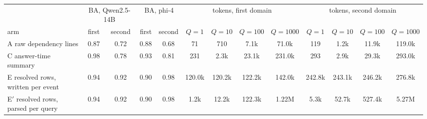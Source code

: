 \begin{tabular}{l cc cc cccc cccc}
\toprule
 & \multicolumn{2}{c}{BA, Qwen2.5-14B} & \multicolumn{2}{c}{BA, phi-4} & \multicolumn{4}{c}{tokens, first domain} & \multicolumn{4}{c}{tokens, second domain} \\
\cmidrule(lr){2-3}\cmidrule(lr){4-5}\cmidrule(lr){6-9}\cmidrule(lr){10-13}
arm & first & second & first & second & $Q{=}1$ & $Q{=}10$ & $Q{=}100$ & $Q{=}1000$ & $Q{=}1$ & $Q{=}10$ & $Q{=}100$ & $Q{=}1000$ \\
\midrule
A raw dependency lines & 0.87 & 0.72 & 0.88 & 0.68 & 71 & 710 & 7.1k & 71.0k & 119 & 1.2k & 11.9k & 119.0k \\
C answer-time summary & 0.98 & 0.78 & 0.93 & 0.81 & 231 & 2.3k & 23.1k & 231.0k & 293 & 2.9k & 29.3k & 293.0k \\
E resolved rows, written per event & 0.94 & 0.92 & 0.90 & 0.98 & 120.0k & 120.2k & 122.2k & 142.0k & 242.8k & 243.1k & 246.2k & 276.8k \\
E$'$ resolved rows, parsed per query & 0.94 & 0.92 & 0.90 & 0.98 & 1.2k & 12.2k & 122.3k & 1.22M & 5.3k & 52.7k & 527.4k & 5.27M \\
\bottomrule
\end{tabular}

